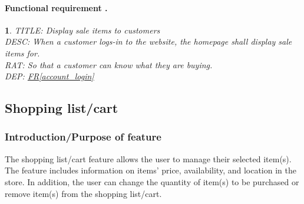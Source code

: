 \documentclass{scrreprt}
\theoremstyle{funreq}
\newtheorem{funreq}{}
\newcommand*{\reqref}[1]{\hyperref[#1]{FR\ref*{#1}}}
\begin{document}
\paragraph[]{Functional requirement .}
\begin{funreq}
	\label{store_displaysales}
	TITLE: Display sale items to customers\\
	DESC: When a customer logs-in to the website, the homepage shall display sale items for.\\
	RAT: So that a customer can know what they are buying.\\
	DEP: \reqref{account_login}\\
\end{funreq}


	\subsection{Shopping list/cart}
	\subsubsection{Introduction/Purpose of feature}
	The shopping list/cart feature allows the user to manage their selected item(s). The feature includes information on items’ price, availability, and location in the store. In addition, the user can change the quantity of item(s) to be purchased or remove item(s) from the shopping list/cart.
	
\end{document}
